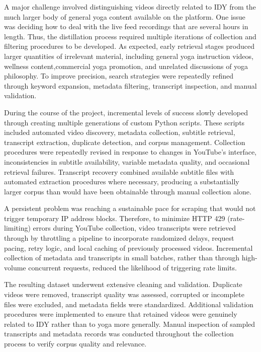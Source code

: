 \documentclass[11pt]{article}
\begin{document}
A major challenge involved distinguishing videos directly related to IDY from the much larger body of general yoga content available on the platform. One issue was deciding how to deal with the live feed recordings that are several hours in length. Thus, the distillation process required multiple iterations of collection and filtering procedures to be developed. As expected, early retrieval stages produced larger quantities of irrelevant material, including general yoga instruction videos, wellness content,commercial yoga promotion, and unrelated discussions of yoga philosophy. To improve precision, search strategies were repeatedly refined through keyword expansion, metadata filtering, transcript inspection, and manual validation.

During the course of the project, incremental levels of success slowly developed through creating multiple generations of custom Python scripts. These scripts included  automated video discovery, metadata collection, subtitle retrieval, transcript extraction, duplicate detection, and corpus management. Collection procedures were repeatedly revised in response to changes in YouTube's interface, inconsistencies in subtitle availability, variable metadata quality, and occasional retrieval failures. Transcript recovery combined available subtitle files with automated extraction procedures where necessary, producing a substantially larger corpus than would have been obtainable through manual collection alone.

A persistent problem was reaching a sustainable pace for scraping that would not trigger temporary IP address blocks. Therefore, to minimize HTTP 429 (rate-limiting) errors during YouTube collection, video transcripts were retrieved through by throttling a pipeline to incorporate randomized delays, request pacing, retry logic, and local caching of previously processed videos. Incremental collection of metadata and transcripts in small batches, rather than through high-volume concurrent requests, reduced the likelihood of triggering rate limits.

The resulting dataset underwent extensive cleaning and validation. Duplicate videos were removed, transcript quality was assessed, corrupted or incomplete files were excluded, and metadata fields were standardized. Additional validation procedures were implemented to ensure that retained videos were genuinely related to IDY rather than to yoga more generally. Manual inspection of sampled transcripts and metadata records was conducted throughout the collection process to verify corpus quality and relevance.
\end{document}
